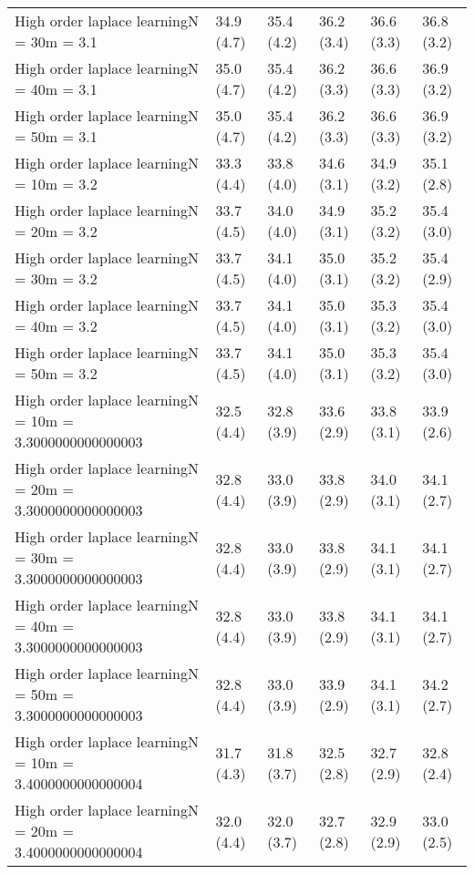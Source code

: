 \documentclass{article}
\begin{document}
\begin{table*}[t!]
\begin{center}
\begin{small}
\begin{sc}
\begin{tabular}{llllll}
High order laplace learningN = 30m = 3.1&34.9 (4.7)      &35.4 (4.2)      &36.2 (3.4)      &36.6 (3.3)      &36.8 (3.2)      \\
High order laplace learningN = 40m = 3.1&35.0 (4.7)      &35.4 (4.2)      &36.2 (3.3)      &36.6 (3.3)      &36.9 (3.2)      \\
High order laplace learningN = 50m = 3.1&35.0 (4.7)      &35.4 (4.2)      &36.2 (3.3)      &36.6 (3.3)      &36.9 (3.2)      \\
High order laplace learningN = 10m = 3.2&33.3 (4.4)      &33.8 (4.0)      &34.6 (3.1)      &34.9 (3.2)      &35.1 (2.8)      \\
High order laplace learningN = 20m = 3.2&33.7 (4.5)      &34.0 (4.0)      &34.9 (3.1)      &35.2 (3.2)      &35.4 (3.0)      \\
High order laplace learningN = 30m = 3.2&33.7 (4.5)      &34.1 (4.0)      &35.0 (3.1)      &35.2 (3.2)      &35.4 (2.9)      \\
High order laplace learningN = 40m = 3.2&33.7 (4.5)      &34.1 (4.0)      &35.0 (3.1)      &35.3 (3.2)      &35.4 (3.0)      \\
High order laplace learningN = 50m = 3.2&33.7 (4.5)      &34.1 (4.0)      &35.0 (3.1)      &35.3 (3.2)      &35.4 (3.0)      \\
High order laplace learningN = 10m = 3.3000000000000003&32.5 (4.4)      &32.8 (3.9)      &33.6 (2.9)      &33.8 (3.1)      &33.9 (2.6)      \\
High order laplace learningN = 20m = 3.3000000000000003&32.8 (4.4)      &33.0 (3.9)      &33.8 (2.9)      &34.0 (3.1)      &34.1 (2.7)      \\
High order laplace learningN = 30m = 3.3000000000000003&32.8 (4.4)      &33.0 (3.9)      &33.8 (2.9)      &34.1 (3.1)      &34.1 (2.7)      \\
High order laplace learningN = 40m = 3.3000000000000003&32.8 (4.4)      &33.0 (3.9)      &33.8 (2.9)      &34.1 (3.1)      &34.1 (2.7)      \\
High order laplace learningN = 50m = 3.3000000000000003&32.8 (4.4)      &33.0 (3.9)      &33.9 (2.9)      &34.1 (3.1)      &34.2 (2.7)      \\
High order laplace learningN = 10m = 3.4000000000000004&31.7 (4.3)      &31.8 (3.7)      &32.5 (2.8)      &32.7 (2.9)      &32.8 (2.4)      \\
High order laplace learningN = 20m = 3.4000000000000004&32.0 (4.4)      &32.0 (3.7)      &32.7 (2.8)      &32.9 (2.9)      &33.0 (2.5)      \\

\end{tabular}
\end{sc}
\end{small}
\end{center}
\end{table*}
\end{document}
